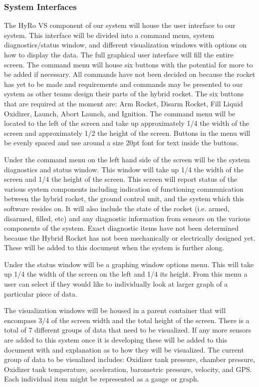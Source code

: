 \documentclass[10pt,draftclsnofoot,onecolumn,retainorgcmds]{IEEEtran}
\begin{document}
\subsubsection{System Interfaces}
The HyRo VS component of our system will house the user interface to our system. This interface will be divided into a command menu, system diagnostics/status window, and different visualization windows with options on how to display the data. The full graphical user interface will fill the entire screen. The command menu will house six buttons with the potential for more to be added if necessary. All commands have not been decided on because the rocket has yet to be made and requirements and commands may be presented to our system as other teams design their parts of the hybrid rocket.  The six buttons that are required at the moment are: Arm Rocket, Disarm Rocket, Fill Liquid Oxidizer, Launch, Abort Launch, and Ignition. The command menu will be located to the left of the screen and take up approximately 1/4 the width of the screen and approximately 1/2 the height of the screen. Buttons in the menu will be evenly spaced and use around a size 20pt font for text inside the buttons. \par
Under the command menu on the left hand side of the screen will be the system diagnostics and status window. This window will take up 1/4 the width of the screen and 1/4 the height of the screen. This screen will report status of the various system components including indication of functioning communication between the hybrid rocket, the ground control unit, and the system which this software resides on. It will also include the state of the rocket (i.e. armed, disarmed, filled, etc) and any diagnostic information from sensors on the various components of the system. Exact diagnostic items have not been determined because the Hybrid Rocket has not been mechanically or electrically designed yet. These will be added to this document when the system is further along.\par 
Under the status window will be a graphing window options menu. This will take up 1/4 the width of the screen on the left and 1/4 its height. From this menu a user can select if they would like to individually look at larger graph of a particular piece of data. \par
The visualization windows will be housed in a parent container that will encompass 3/4 of the screen width and the total height of the screen. There is a total of 7 different groups of data that need to be visualized.  If any more sensors are added to this system once it is developing these will be added to this document with and explanation as to how they will be visualized.  The current group of data to be visualized includes:  Oxidizer tank pressure, chamber pressure, Oxidizer tank temperature, acceleration, barometric pressure, velocity, and GPS.   Each individual item might be represented as a gauge or graph.\par
\end{document}
